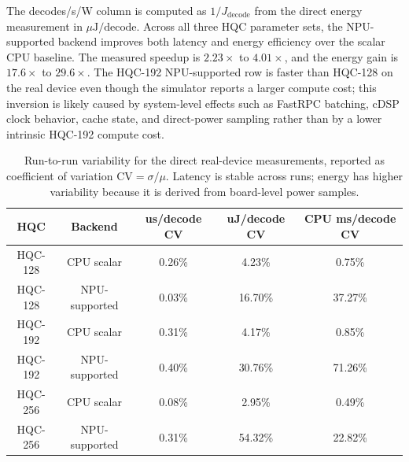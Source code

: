 The decodes/s/W column is computed as \(1/J_{\mathrm{decode}}\) from the direct energy measurement in \(\mu\mathrm{J}/\mathrm{decode}\). Across all three HQC parameter sets, the NPU-supported backend improves both latency and energy efficiency over the scalar CPU baseline. The measured speedup is \(2.23\times\) to \(4.01\times\), and the energy gain is \(17.6\times\) to \(29.6\times\). The HQC-192 NPU-supported row is faster than HQC-128 on the real device even though the simulator reports a larger compute cost; this inversion is likely caused by system-level effects such as FastRPC batching, cDSP clock behavior, cache state, and direct-power sampling rather than by a lower intrinsic HQC-192 compute cost.

\begin{table}[htbp]
\centering
\renewcommand{\arraystretch}{1.15}
\small
\begin{tabular}{|c|c|c|c|c|}
\hline
\textbf{HQC} & \textbf{Backend} & \textbf{us/decode CV} &
\textbf{uJ/decode CV} & \textbf{CPU ms/decode CV} \\
\hline
HQC-128 & CPU scalar    & 0.26\% & 4.23\% & 0.75\% \\
\hline
HQC-128 & NPU-supported & 0.03\% & 16.70\% & 37.27\% \\
\hline
HQC-192 & CPU scalar    & 0.31\% & 4.17\% & 0.85\% \\
\hline
HQC-192 & NPU-supported & 0.40\% & 30.76\% & 71.26\% \\
\hline
HQC-256 & CPU scalar    & 0.08\% & 2.95\% & 0.49\% \\
\hline
HQC-256 & NPU-supported & 0.31\% & 54.32\% & 22.82\% \\
\hline
\end{tabular}
\vspace{0.5em}
\caption{Run-to-run variability for the direct real-device measurements, reported as coefficient of variation \(\mathrm{CV}=\sigma/\mu\). Latency is stable across runs; energy has higher variability because it is derived from board-level power samples.}
\label{tab:real-device-stability}
\end{table}

